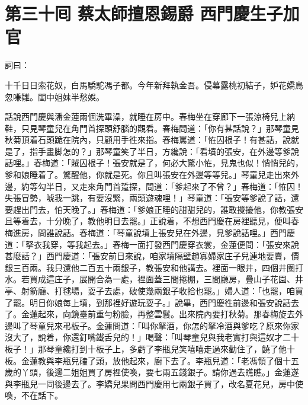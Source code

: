 
\chapter*{第三十囘 蔡太師擅恩錫爵 西門慶生子加官}


詞曰：

\begin{myquote}
十千日日索花奴，白馬驕駝馮子都。今年新拜執金吾。侵幕露桃初結子，妒花嬌鳥忽嗛雛。閨中姐妹半愁娛。

\end{myquote}

話說西門慶與潘金蓮兩個洗畢澡，就睡在房中。春梅坐在穿廊下一張涼椅兒上納鞋，只見琴童兒在角門首探頭舒腦的觀看。春梅問道：「你有甚話說？」那琴童見秋菊頂着石頭跪在院內，只顧用手徃來指。{}春梅罵道：「恠囚根子！有甚話，說就是了，指手畫脚怎的？」那琴童笑了半日，方纔說：「看墳的張安，在外邊等爹說話哩。」春梅道：「賊囚根子！張安就是了，何必大驚小恠，見鬼也似！悄悄兒的，爹和娘睡着了。驚醒他，你就是死。你且叫張安在外邊等等兒。」琴童兒走出來外邊，約等勾半日，又走來角門首踅探，問道：「爹起來了不曾？」春梅道：「恠囚！失張冒勢，唬我一跳，有要沒緊，兩頭遊魂哩！」琴童道：「張安等爹說了話，還要趕出門去，怕天晚了。」春梅道：「爹娘正睡的甜甜兒的，誰敢攪擾他，你教張安且等着去，十分晚了，教他明日去罷。」正說着，不想西門慶在房裡聽見，便叫春梅進房，問誰說話。春梅道：「琴童說墳上張安兒在外邊，見爹說話哩。」西門慶道：「拏衣我穿，等我起去。」春梅一面打發西門慶穿衣裳，金蓮便問：「張安來說甚麼話？」西門慶道：「張安前日來說，咱家墳隔壁趙寡婦家庄子兒連地要賣，價銀三百兩。我只還他二百五十兩銀子，教張安和他講去。裡面一眼井，四個井圈打水。{}若買成這庄子，展開合為一處，裡面蓋三間捲棚，三間廳房，疊山子花園、井亭、射箭廳、打毬場，耍子去處，破使幾兩銀子收拾也罷。」婦人道：「也罷，咱買了罷。明日你娘每上墳，到那裡好遊玩耍子。」說畢，西門慶徃前邊和張安說話去了。金蓮起來，向鏡臺前重勻粉臉，再整雲鬟。出來院內要打秋菊。那春梅旋去外邊叫了琴童兒來弔板子。金蓮問道：「叫你拏酒，你怎的拏冷酒與爹吃？原來你家沒大了，說着，你還釘嘴鐵舌兒的！」喝聲：「叫琴童兒與我老實打與這奴才二十板子！」那琴童纔打到十板子上，多虧了李瓶兒笑嘻嘻走過來勸住了，饒了他十板。{}金蓮教與李瓶兒磕了頭，放他起來，廚下去了。李瓶兒道：「老馮領了個十五歲的丫頭，後邊二姐姐買了房裡使喚，要七兩五錢銀子。請你過去瞧瞧。」金蓮遂與李瓶兒一同後邊去了。李嬌兒果問西門慶用七兩銀子買了，改名夏花兒，房中使喚，不在話下。

